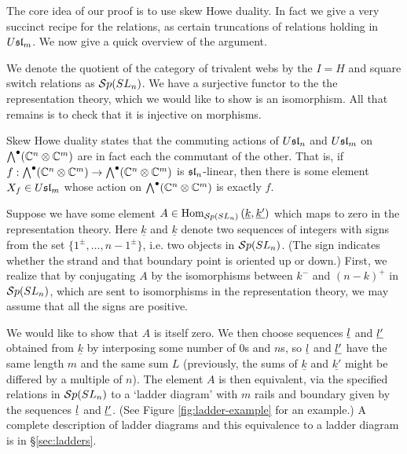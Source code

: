 \documentclass[10pt,leqno]{article}
\begin{document}
The core idea of our proof is to use skew Howe duality. In fact we give a very succinct recipe for the relations, as certain truncations of relations holding in $\Usl{m}$. We now give a quick overview of the argument.

We denote the quotient of the category of trivalent webs by the $I=H$ and square switch relations as $\Sp(SL_n)$. We have a surjective functor to the the representation theory, which we would like to show is an isomorphism. All that remains is to check that it is injective on morphisms.

Skew Howe duality states that the commuting actions of $\Usl{n}$ and $\Usl{m}$ on $\Alt^\bullet(\mathbb{C}^n \tensor \mathbb{C}^m)$ are in fact each the commutant of the other. That is, if  $f: \Alt^\bullet(\mathbb{C}^n \tensor \mathbb{C}^m) \to \Alt^\bullet(\mathbb{C}^n \tensor \mathbb{C}^m)$ is $\sl_n$-linear, then there is some element $X_f \in \Usl{m}$ whose action on  $\Alt^\bullet(\mathbb{C}^n \tensor \mathbb{C}^m)$ is exactly $f$.

Suppose we have some element $A \in \Homa{\Sp(SL_n)}{\underline{k}}{\underline{k'}}$ which maps to zero in the representation theory. Here $\underline{k}$ and $\underline{k}$ denote two sequences of integers with signs from the set $\{1^\pm,\ldots,n-1^\pm\}$, i.e. two objects in $\Sp(SL_n)$. (The sign indicates whether the strand and that boundary point is oriented up or down.) First, we realize that by conjugating $A$ by the isomorphisms between $k^-$ and $(n-k)^+$ in $\Sp(SL_n)$, which are sent to isomorphisms in the representation theory, we may assume that all the signs are positive.

 We would like to show that $A$ is itself zero. 
 We then choose sequences $\ul{l}$ and $\ul{l'}$ obtained from $\underline{k}$ by interposing some number of $0$s and $n$s, so $\ul{l}$ and $\ul{l'}$ have the same length $m$ and the same sum $L$ (previously, the sums of $\underline{k}$ and $\underline{k'}$ might be differed by a multiple of $n$).
 The element $A$ is then equivalent, via the specified relations in $\Sp(SL_n)$ to a `ladder diagram' with $m$ rails and boundary given by the sequences $\ul{l}$ and $\ul{l'}$. (See Figure \ref{fig:ladder-example} for an example.)
A complete description of ladder diagrams and this equivalence to a ladder diagram is in \S \ref{sec:ladders}.
\end{document}
